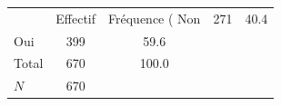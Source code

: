 {
\def\sym#1{\ifmmode^{#1}\else\(^{#1}\)\fi}
\begin{tabular}{l*{1}{cc}}
\toprule
            &    Effectif&Fréquence (%
\midrule
Non         &         271&        40.4\\
Oui         &         399&        59.6\\
Total       &         670&       100.0\\
\midrule
\(N\)       &         670&            \\
\bottomrule
\end{tabular}
}
